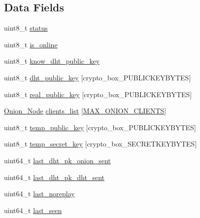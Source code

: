 \subsection*{Data Fields}
\begin{DoxyCompactItemize}
\item 
uint8\+\_\+t \hyperlink{struct_onion___friend_ade818037fd6c985038ff29656089758d}{status}
\item 
uint8\+\_\+t \hyperlink{struct_onion___friend_a6e539a068fed61fab47b62f467c1d208}{is\+\_\+online}
\item 
uint8\+\_\+t \hyperlink{struct_onion___friend_a1b66769a2b6f8e5c7306ffcfb7ac0956}{know\+\_\+dht\+\_\+public\+\_\+key}
\item 
uint8\+\_\+t \hyperlink{struct_onion___friend_ab2ecaa07625ad0ed5e07d3a1f0dcc939}{dht\+\_\+public\+\_\+key} \mbox{[}crypto\+\_\+box\+\_\+\+P\+U\+B\+L\+I\+C\+K\+E\+Y\+B\+Y\+T\+E\+S\mbox{]}
\item 
uint8\+\_\+t \hyperlink{struct_onion___friend_a996dcaefa2a5954a199e2beb584c1feb}{real\+\_\+public\+\_\+key} \mbox{[}crypto\+\_\+box\+\_\+\+P\+U\+B\+L\+I\+C\+K\+E\+Y\+B\+Y\+T\+E\+S\mbox{]}
\item 
\hyperlink{struct_onion___node}{Onion\+\_\+\+Node} \hyperlink{struct_onion___friend_a6797ac2f59ba5ef59a8a70cd6515ca25}{clients\+\_\+list} \mbox{[}\hyperlink{onion__client_8h_ab1de7815e06277ced6779ba201b0b716}{M\+A\+X\+\_\+\+O\+N\+I\+O\+N\+\_\+\+C\+L\+I\+E\+N\+T\+S}\mbox{]}
\item 
uint8\+\_\+t \hyperlink{struct_onion___friend_afc342de3f1533c0adfd762a6fd0d20ab}{temp\+\_\+public\+\_\+key} \mbox{[}crypto\+\_\+box\+\_\+\+P\+U\+B\+L\+I\+C\+K\+E\+Y\+B\+Y\+T\+E\+S\mbox{]}
\item 
uint8\+\_\+t \hyperlink{struct_onion___friend_a6de303feb7b7892cc6a38228554b3e78}{temp\+\_\+secret\+\_\+key} \mbox{[}crypto\+\_\+box\+\_\+\+S\+E\+C\+R\+E\+T\+K\+E\+Y\+B\+Y\+T\+E\+S\mbox{]}
\item 
uint64\+\_\+t \hyperlink{struct_onion___friend_ac83f72b06d86503ee29943ccbe7f1a7a}{last\+\_\+dht\+\_\+pk\+\_\+onion\+\_\+sent}
\item 
uint64\+\_\+t \hyperlink{struct_onion___friend_a412168e37e1bdf5545f814c9c487aaeb}{last\+\_\+dht\+\_\+pk\+\_\+dht\+\_\+sent}
\item 
uint64\+\_\+t \hyperlink{struct_onion___friend_afeea50a96c079a530de60cf6389ec1bd}{last\+\_\+noreplay}
\item 
uint64\+\_\+t \hyperlink{struct_onion___friend_a7418e248decb1dc63d1e1c8960092c33}{last\+\_\+seen}
\item 

\end{DoxyCompactItemize}
